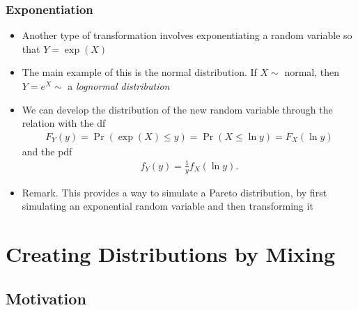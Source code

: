\documentclass{beamer}
\begin{document}
\begin{frame}%
\frametitle{Exponentiation}
\begin{itemize}
\item Another type of transformation involves exponentiating a random variable so that $Y=\exp(X)$ %
\item The main example of this is the normal distribution. If $X \sim$ normal, then $Y=e^{X} \sim $ a \textit{lognormal
distribution} %
\item We can develop the distribution of the new random variable through the relation with the df
\begin{eqnarray*}
F_Y (y) = \Pr ( \exp(X) \le y) = \Pr( X \le \ln y) = F_X (\ln y)
 \end{eqnarray*} %
and the pdf
\begin{eqnarray*}
f_Y (y) = \frac{1}{y} f_X (\ln y) .
 \end{eqnarray*} %
\item Remark. This provides a way to simulate a Pareto distribution, by first simulating an exponential random variable and then transforming it
\end{itemize}

\end{frame}



\section{Creating Distributions by Mixing}

\subsection{Motivation}
\end{document}

